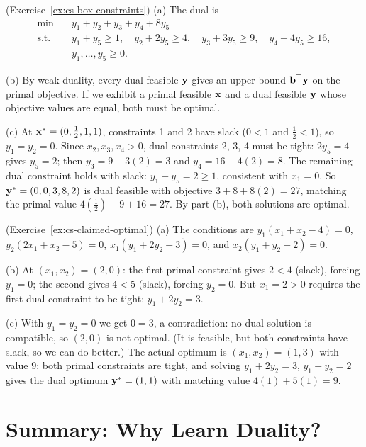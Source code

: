 \begin{solution}(Exercise~\ref{ex:cs-box-constraints})
(a) The dual is
\[
\begin{aligned}
\min \quad & y_1 + y_2 + y_3 + y_4 + 8y_5 \\
\text{s.t.} \quad & y_1 + y_5 \geq 1, \quad y_2 + 2y_5 \geq 4, \quad y_3 + 3y_5 \geq 9, \quad y_4 + 4y_5 \geq 16, \\
& y_1, \dots, y_5 \geq 0.
\end{aligned}
\]

(b) By weak duality, every dual feasible $\mathbf{y}$ gives an upper bound $\mathbf{b}^\top \mathbf{y}$ on the primal objective.  If we exhibit a primal feasible $\mathbf{x}$ and a dual feasible $\mathbf{y}$ whose objective values are equal, both must be optimal.

(c) At $\mathbf{x}^* = (0, \tfrac{1}{2}, 1, 1)$, constraints 1 and 2 have slack ($0 < 1$ and $\tfrac12 < 1$), so $y_1 = y_2 = 0$.  Since $x_2, x_3, x_4 > 0$, dual constraints 2, 3, 4 must be tight: $2y_5 = 4$ gives $y_5 = 2$; then $y_3 = 9 - 3(2) = 3$ and $y_4 = 16 - 4(2) = 8$.  The remaining dual constraint holds with slack: $y_1 + y_5 = 2 \geq 1$, consistent with $x_1 = 0$.  So $\mathbf{y}^* = (0, 0, 3, 8, 2)$ is dual feasible with objective $3 + 8 + 8(2) = 27$, matching the primal value $4(\tfrac12) + 9 + 16 = 27$.  By part (b), both solutions are optimal.
\end{solution}

\begin{solution}(Exercise~\ref{ex:cs-claimed-optimal})
(a) The conditions are $y_1(x_1 + x_2 - 4) = 0$, $y_2(2x_1 + x_2 - 5) = 0$, $x_1(y_1 + 2y_2 - 3) = 0$, and $x_2(y_1 + y_2 - 2) = 0$.

(b) At $(x_1, x_2) = (2, 0)$: the first primal constraint gives $2 < 4$ (slack), forcing $y_1 = 0$; the second gives $4 < 5$ (slack), forcing $y_2 = 0$.  But $x_1 = 2 > 0$ requires the first dual constraint to be tight: $y_1 + 2y_2 = 3$.

(c) With $y_1 = y_2 = 0$ we get $0 = 3$, a contradiction: no dual solution is compatible, so $(2,0)$ is not optimal.  (It is feasible, but both constraints have slack, so we can do better.)  The actual optimum is $(x_1, x_2) = (1, 3)$ with value $9$: both primal constraints are tight, and solving $y_1 + 2y_2 = 3$, $y_1 + y_2 = 2$ gives the dual optimum $\mathbf{y}^* = (1,1)$ with matching value $4(1) + 5(1) = 9$.
\end{solution}

\section*{Summary: Why Learn Duality?}

